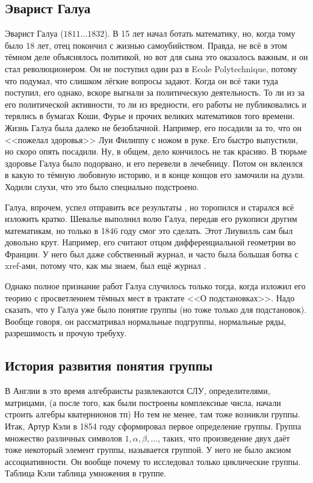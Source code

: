 \documentclass[a4paper,oneside,fleqn,10pt]{article}
\newcommand{\pe}[2]{${#1}\ldots{#2}$}
\begin{document}
\subsection{Эварист Галуа}

Эварист Галуа (\pe{1811}{1832}). В 15 лет начал ботать математику, но,
когда тому было 18 лет, отец покончил с жизнью самоубийством. Правда,
не всё в этом тёмном деле объяснялось политикой, но вот для сына это
оказалось важным, и он стал революционером.  Он не поступил один раз в
Ecole Polytechnique, потому что подумал, что слишком лёгкие вопросы
задают. Когда он всё таки туда поступил, его однако, вскоре выгнали за
политическую деятельность.  То ли из за его политической активности,
то ли из вредности, его работы не публиковались и терялись в бумагах
Коши, Фурье и прочих великих математиков того времени.  Жизнь Галуа
была далеко не безоблачной. Например, его посадили за то, что он
<<пожелал здоровья>> Луи Филиппу с ножом в руке. Его быстро выпустили,
но скоро опять посадили.  Ну, в общем, дело кончилось не так
красиво. В тюрьме здоровье Галуа было подорвано, и его перевели в
лечебницу. Потом он вклеился в какую то тёмную любовную историю, и в
конце концов его замочили на дуэли. Ходили слухи, что это было
специально подстроено.

Галуа, впрочем, успел отправить все результаты
, но торопился и старался всё изложить
кратко. Шевалье выполнил волю Галуа, передав его рукописи другим
математикам, но только в 1846 году  смог это сделать. Этот Лиувилль сам был довольно
крут. Например, его считают отцом дифференциальной геометрии во
Франции. У него был даже собственный журнал, и часто была большая
ботва с xref-ами, потому что, как мы знаем, был ещё журнал
.

Однако полное признание работ Галуа случилось только тогда, когда
 изложил его теорию с
просветлением тёмных мест в трактате <<О подстановках>>.  Надо
сказать, что у Галуа уже было понятие группы (но тоже только для
подстановок).  Вообще говоря, он рассматривал нормальные подгруппы,
нормальные ряды, разрешимость и прочую требуху.

\subsection{История развития понятия группы}

В Англии в это время алгебраисты развлекаются СЛУ, определителями,
матрицами, (а после того, как были построены комплексные числа, начали
строить алгебры кватернионов тп) Но тем не менее, там тоже возникли
группы. Итак, Артур Кэли в 1854 году сформировал первое определение
группы.  Группа множество различных символов $1, \alpha,
\beta,\ldots$, таких, что произведение двух даёт тоже некоторый
элемент группы, называется группой.  У него не было аксиом
ассоциативности. Он вообще почему то исследовал только циклические
группы. Таблица Кэли таблица умножения в группе.
\end{document}
